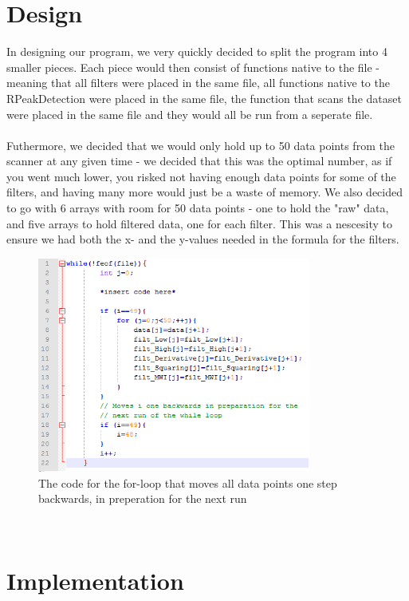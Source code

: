 \documentclass[12pt,a4paper]{article}
\begin{document}
\section{Design}
	In designing our program, we very quickly decided to split the program into 4 smaller pieces. Each piece would then consist of functions native to the file - meaning that all filters were placed in the same file, all functions native to the RPeakDetection were placed in the same file, the function that scans the dataset were placed in the same file and they would all be run from a seperate file.\\
\\
	Futhermore, we decided that we would only hold up to 50 data points from the scanner at any given time - we decided that this was the optimal number, as if you went much lower, you risked not having enough data points for some of the filters, and having many more would just be a waste of memory. We also decided to go with 6 arrays with room for 50 data points - one to hold the "raw" data, and five arrays to hold filtered data, one for each filter. This was a nescesity to ensure we had both the x- and the y-values needed in the formula for the filters.\\
\begin{figure}[h!]
  \centering
    \includegraphics[width=0.8\textwidth]{moveback_loop.png}
  \caption{The code for the for-loop that moves all data points one step backwards, in preperation for the next run}
\end{figure}
\\

\section{Implementation}
\end{document}
